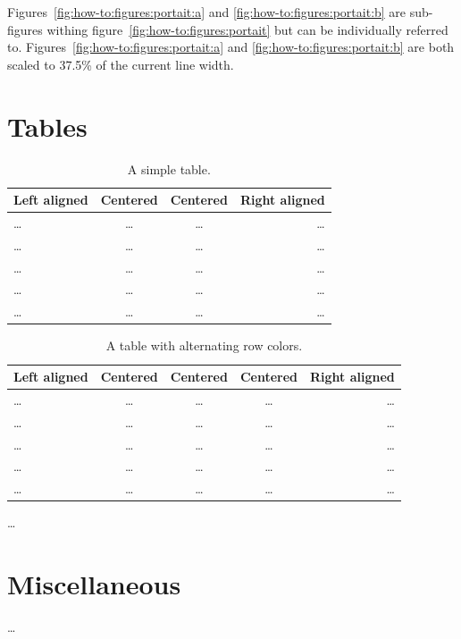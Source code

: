 Figures~\ref{fig:how-to:figures:portait:a} and \ref{fig:how-to:figures:portait:b} are sub-figures
withing figure~\ref{fig:how-to:figures:portait} but can be individually referred
to. Figures~\ref{fig:how-to:figures:portait:a} and \ref{fig:how-to:figures:portait:b} are both
scaled to 37.5\% of the current line width.
\par

\section{Tables}
\label{app:how-to:tables}

\begin{table}
  \centering
  \sffamily
  \begin{tabular}{lccr}
    \toprule
    Left aligned  & Centered & Centered & Right aligned\\
    \midrule
    \ldots & \ldots   & \ldots   & \ldots \\
    \ldots & \ldots   & \ldots   & \ldots \\
    \ldots & \ldots   & \ldots   & \ldots \\
    \ldots & \ldots   & \ldots   & \ldots \\
    \ldots & \ldots   & \ldots   & \ldots \\
    \bottomrule
  \end{tabular}
  \caption[A simple table]{A simple table.}
  \label{tab:how-to:tables:example1}
\end{table}
\begin{table}
  \centering
  \sffamily
  \begin{tabular}{lcccr}
    \toprule
    Left aligned  & Centered & Centered & Centered & Right aligned\\
    \midrule
    \ldots & \ldots   & \ldots   & \ldots   & \ldots \\
    \ldots & \ldots   & \ldots   & \ldots   & \ldots \\
    \ldots & \ldots   & \ldots   & \ldots   & \ldots \\
    \ldots & \ldots   & \ldots   & \ldots   & \ldots \\
    \ldots & \ldots   & \ldots   & \ldots   & \ldots \\
    \bottomrule
  \end{tabular}
  \caption[Alternating row-color table]{A table with alternating row colors.}
  \label{tab:how-to:tables:example2}
\end{table}
\ldots
\par

\section{Miscellaneous}
\label{app:how-to:miscellaneous}

\ldots
\par

